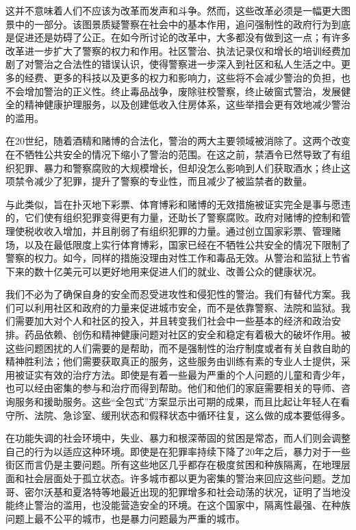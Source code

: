 \documentclass[fontset=fandol, a4paper, 12pt, openright]{ctexbook}
\begin{document}
这并不意味着人们不应该为改革而发声和斗争。然而，这些改革必须是一幅更大图景中的一部分。该图景质疑警察在社会中的基本作用，追问强制性的政府行为到底是促进还是妨碍了公正。在如今所讨论的改革中，大多都没有做到这一点；有许多改革进一步扩大了警察的权力和作用。社区警治、执法记录仪和增长的培训经费加剧了对警治之合法性的错误认识，使得警察进一步深入到社区和私人生活之中。更多的经费、更多的科技以及更多的权力和影响力，这些将不会减少警治的负担，也不会增加警治的正义性。终止毒品战争，废除驻校警察，终止破窗式警治，发展健全的精神健康护理服务，以及创建低收入住房体系，这些举措会更有效地减少警治的滥用。

在20世纪，随着酒精和赌博的合法化，警治的两大主要领域被消除了。这两个改变在不牺牲公共安全的情况下缩小了警治的范围。在这之前，禁酒令已然导致了有组织犯罪、暴力和警察腐败的大规模增长，但却没怎么影响到人们获取酒水；终止这项禁令减少了犯罪，提升了警察的专业性，而且减少了被监禁者的数量。

与此类似，旨在扑灭地下彩票、体育博彩和赌博的无效措施被证实完全是事与愿违的，它们使有组织犯罪变得更有力量，还助长了警察腐败。政府对赌博的控制和管理使税收收入增加，并且削弱了有组织犯罪的力量。通过创立国家彩票、管理赌场，以及在最低限度上实行体育博彩，国家已经在不牺牲公共安全的情况下限制了警察的权力。如今，同样的措施没理由对性工作和毒品无效。从警治和监狱上节省下来的数十亿美元可以更好地用来促进人们的就业、改善公众的健康状况。

我们不必为了确保自身的安全而忍受进攻性和侵犯性的警治。我们有替代方案。我们可以利用社区和政府的力量来促进城市安全，而不是依靠警察、法院和监狱。我们需要加大对个人和社区的投入，并且转变我们社会中一些基本的经济和政治安排。药品依赖、创伤和精神健康问题对社区的安全和稳定有着极大的破坏作用。被这些问题困扰的人们需要的是帮助，而不是强制性的治疗制度或者有关自救自助的精神胜利法；他们需要获取真正的服务，这些服务由训练有素的专业人士提供，采用被证实有效的治疗方法。即使是有着一些最为严重的个人问题的儿童和青少年，也可以经由密集的参与和治疗而得到帮助。他们和他们的家庭需要相关的导师、咨询服务和援助服务。这些“全包式”方案显示出可期的成果，而且比起让年轻人在看守所、法院、急诊室、缓刑状态和假释状态中循环往复，这么做的成本要低得多。

在功能失调的社会环境中，失业、暴力和根深蒂固的贫困是常态，而人们则会调整自己的行为以适应这种环境。即使是在犯罪率持续下降了20年之后，暴力对于一些街区而言仍是主要问题。所有这些地区几乎都存在极度贫困和种族隔离，在地理层面和社会层面处于孤立状态。许多城市都以更为密集的警治来回应这些问题。芝加哥、密尔沃基和夏洛特等地最近出现的犯罪增多和社会动荡的状况，证明了当地没能终止警治的滥用，也没能营造安全的环境。在这个国家中，隔离性最强、在种族问题上最不公平的城市，也是暴力问题最为严重的城市。
\end{document}

